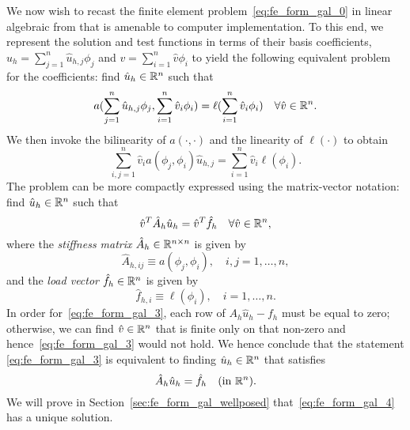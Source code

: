 We now wish to recast the finite element problem~\eqref{eq:fe_form_gal_0} in linear algebraic from that is amenable to computer implementation.  To this end, we represent the solution and test functions in terms of their basis coefficients, $u_h = \sum_{j=1}^n \hat u_{h,j} \phi_j$ and $v = \sum_{i=1}^n \hat v \phi_i$ to yield the following equivalent problem for the coefficients: find $\hat u_h \in \mathbb{R}^n$ such that
\begin{equation*}
  a(\sum_{j=1}^n \hat u_{h,j} \phi_j, \sum_{i=1}^n \hat v_i \phi_i)
  = \ell(\sum_{i=1}^n \hat v_i \phi_i) \quad \forall \hat v \in \mathbb{R}^n.
\end{equation*}
We then invoke the bilinearity of $a(\cdot,\cdot)$ and the linearity of $\ell(\cdot)$ to obtain
\begin{equation*}
  \sum_{i,j = 1}^n \hat v_i a(\phi_j,\phi_i) \hat u_{h,j} = \sum_{i=1}^n \hat v_i \ell(\phi_i).
\end{equation*}
The problem can be more compactly expressed using the matrix-vector notation: find $\hat u_h \in \mathbb{R}^n$ such that
\begin{equation}
  \hat v^T \hat A_h \hat u_h = \hat v^T \hat f_h \quad \forall \hat v \in \mathbb{R}^n,
  \label{eq:fe_form_gal_3}
\end{equation}
where the \emph{stiffness matrix} $\hat A_h \in \mathbb{R}^{n \times n}$ is given by
\begin{equation*}
  \hat A_{h,ij} \equiv a(\phi_j, \phi_i), \quad i,j = 1,\dots,n,
\end{equation*}
and the \emph{load vector} $\hat f_h \in \mathbb{R}^n$ is given by
\begin{equation*}
  \hat f_{h,i} \equiv \ell(\phi_i), \quad i = 1,\dots,n.
\end{equation*}
In order for~\eqref{eq:fe_form_gal_3}, each row of $A_h \hat u_h - f_h$ must be equal to zero; otherwise, we can find $\hat v \in \mathbb{R}^n$ that is finite only on that non-zero and hence~\eqref{eq:fe_form_gal_3} would not hold.  We hence conclude that the statement \eqref{eq:fe_form_gal_3} is equivalent to finding $\hat u_h \in \mathbb{R}^n$ that satisfies 
\begin{equation}
  \hat A_h \hat u_h = \hat f_h  \quad \text{(in $\mathbb{R}^n$)}.
  \label{eq:fe_form_gal_4}
\end{equation}
We will prove in Section~\ref{sec:fe_form_gal_wellposed} that~\eqref{eq:fe_form_gal_4} has a unique solution.

